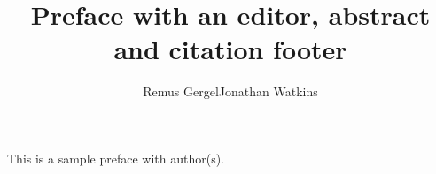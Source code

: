 \documentclass[output=paper]{langsci/langscibook}
\title{Preface with an editor, abstract and citation footer}
\author{Remus Gergel\affiliation{Universität des Saarlandes}\lastand Jonathan Watkins\affiliation{Universität des Saarlandes}}
\begin{document}
\maketitle

\noindent This is a sample preface with author(s).

{\sloppy\printbibliography[heading=subbibliography,notkeyword=this]}
\end{document}
